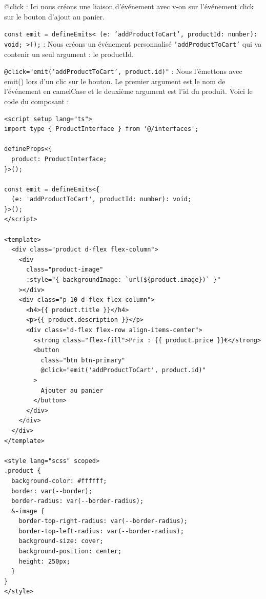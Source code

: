 \documentclass{article}
\begin{document}
{\color{monOrange}@click} : Ici nous créons une liaison d'événement avec {\color{monOrange}v-on} sur l'événement {\color{monOrange}click} sur le bouton d'ajout au panier.

{\tt const emit = defineEmits<{ (e: 'addProductToCart', productId: number): void; }>();} : Nous créons un événement personnalisé {\tt 'addProductToCart'} qui va contenir un seul argument : le {\color{monOrange}productId}.

{\tt @click="emit('addProductToCart', product.id)"} : Nous l'émettons avec {\color{monOrange}emit()} lors d'un clic sur le bouton. Le premier argument est le nom de l'événement en {\color{monOrange}camelCase} et le deuxième argument est l'{\color{monOrange}id} du produit. Voici le code du composant :
\begin{verbatim}
<script setup lang="ts">
import type { ProductInterface } from '@/interfaces';

defineProps<{
  product: ProductInterface;
}>();

const emit = defineEmits<{
  (e: 'addProductToCart', productId: number): void;
}>();
</script>

<template>
  <div class="product d-flex flex-column">
    <div
      class="product-image"
      :style="{ backgroundImage: `url(${product.image})` }"
    ></div>
    <div class="p-10 d-flex flex-column">
      <h4>{{ product.title }}</h4>
      <p>{{ product.description }}</p>
      <div class="d-flex flex-row align-items-center">
        <strong class="flex-fill">Prix : {{ product.price }}€</strong>
        <button
          class="btn btn-primary"
          @click="emit('addProductToCart', product.id)"
        >
          Ajouter au panier
        </button>
      </div>
    </div>
  </div>
</template>

<style lang="scss" scoped>
.product {
  background-color: #ffffff;
  border: var(--border);
  border-radius: var(--border-radius);
  &-image {
    border-top-right-radius: var(--border-radius);
    border-top-left-radius: var(--border-radius);
    background-size: cover;
    background-position: center;
    height: 250px;
  }
}
</style>
\end{verbatim}

\end{document}
